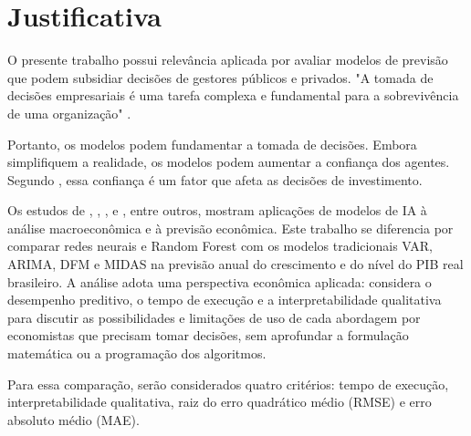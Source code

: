 \section{Justificativa} 
O presente trabalho possui relevância aplicada por avaliar modelos de previsão que podem subsidiar decisões de gestores públicos e privados. "A  tomada  de  decisões  empresariais  é  uma  tarefa  complexa  e  fundamental  para  a  sobrevivência de uma organização" .

Portanto, os modelos podem fundamentar a tomada de decisões. Embora simplifiquem a realidade, os modelos podem aumentar a confiança dos agentes. Segundo , essa confiança é um fator que afeta as decisões de investimento.

Os estudos de , , ,  e , entre outros, mostram aplicações de modelos de IA à análise macroeconômica e à previsão econômica. Este trabalho se diferencia por comparar redes neurais e Random Forest com os modelos tradicionais VAR, ARIMA, DFM e MIDAS na previsão anual do crescimento e do nível do PIB real brasileiro. A análise adota uma perspectiva econômica aplicada: considera o desempenho preditivo, o tempo de execução e a interpretabilidade qualitativa para discutir as possibilidades e limitações de uso de cada abordagem por economistas que precisam tomar decisões, sem aprofundar a formulação matemática ou a programação dos algoritmos.


Para essa comparação, serão considerados quatro critérios: tempo de execução, interpretabilidade qualitativa, raiz do erro quadrático médio (RMSE) e erro absoluto médio (MAE).

	
